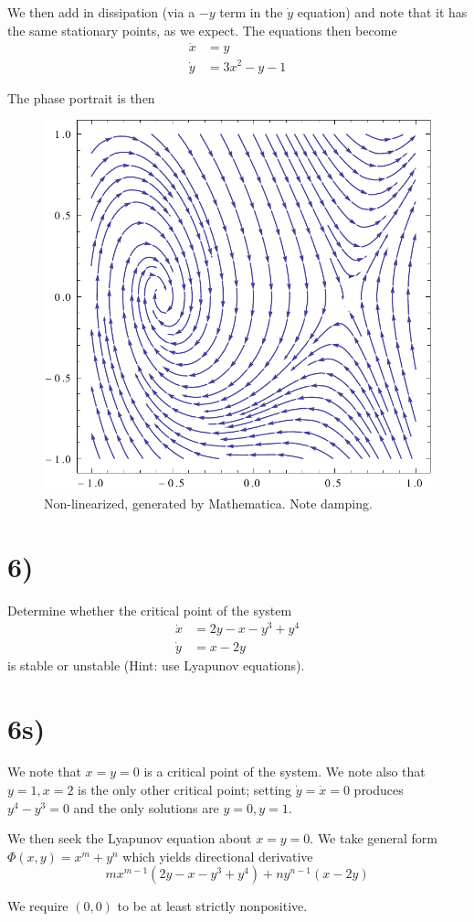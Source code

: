 \documentclass[10pt,twocolumn]{article}
\begin{document}
We then add in dissipation (via a $-y$ term in the $\dot{y}$ equation) and note that it has the same stationary points, as we expect. The equations then become
\begin{align*}
    \dot{x} &= y\\
    \dot{y} &= 3x^2 -y - 1
\end{align*}

The phase portrait is then
\begin{figure}[!h]
    \centering
    \includegraphics[scale=0.3]{Ma2aFinal5bPhase.pdf}
    \caption{Non-linearized, generated by Mathematica. Note damping.}
\end{figure}

\section*{6)}

Determine whether the critical point of the system
\begin{align*}
    \dot{x} &= 2y - x - y^3 + y^4\\
    \dot{y} &= x - 2y
\end{align*}
is stable or unstable (Hint: use Lyapunov equations).

\section*{6s)}

We note that $x = y = 0$ is a critical point of the system. We note also that $y=1, x=2$ is the only other critical point; setting $\dot{y} = \dot{x} = 0$ produces $y^4 - y^3 = 0$ and the only solutions are $y=0, y=1$.

We then seek the Lyapunov equation about $x=y=0$. We take general form $\Phi(x,y) = x^m + y^n$ which yields directional derivative
$$mx^{m-1}\left( 2y - x - y^3 + y^4 \right) + ny^{n-1}\left( x-2y \right)$$

We require $(0,0)$ to be at least strictly nonpositive. 
\end{document}
